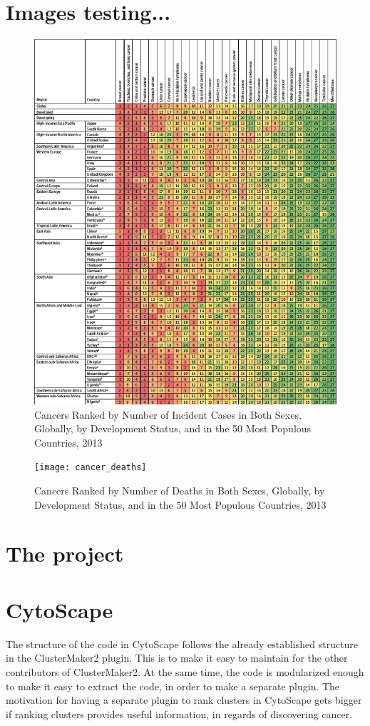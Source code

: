 \documentclass[UKenglish]{ifimaster}
\begin{document}
\part{Images testing...}
\begin{figure}[ht]
    \caption{Cancers Ranked by Number of Incident Cases in Both Sexes, Globally, by Development Status, and in the 50
            Most Populous Countries, 2013}
    \includegraphics{cancer_incidents}
\end{figure}

\begin{figure}[ht]
    \caption{Cancers Ranked by Number of Deaths in Both Sexes, Globally, by Development Status, and in the 50 Most
            Populous Countries, 2013}
    \texttt{[image: cancer\_deaths]}
\end{figure}

\part{The project}
\part{CytoScape} %
The structure of the code in CytoScape follows the already established structure
in the ClusterMaker2 plugin. This is to make it easy to maintain for the other
contributors of ClusterMaker2. At the same time, the code is modularized enough
to make it easy to extract the code, in order to make a separate plugin. The
motivation for having a separate plugin to rank clusters in CytoScape gets
bigger if ranking clusters provides useful information, in regards of
discovering cancer.
\end{document}
